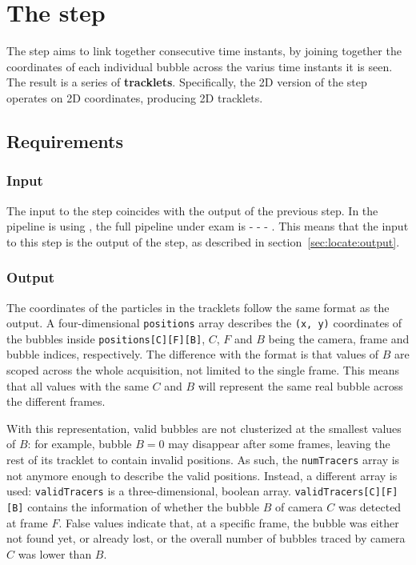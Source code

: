 \chapter{The \linkDD* step}
\label{chap:2dlink}

The \link* step aims to link together consecutive time instants, by joining together the coordinates of each individual bubble across the varius time instants it is seen.
The result is a series of \textbf{tracklets}.
Specifically, the 2D version of the \link* step operates on 2D coordinates, producing 2D tracklets.

\section{Requirements}

\subsection{Input}

The input to the \link* step coincides with the output of the previous step.
In the pipeline is using \linkDD*, the full pipeline under exam is \locate* - \link* - \match* - \visual*.
This means that the input to this step is the output of the \locate* step, as described in section~\ref{sec:locate:output}.

\subsection{Output}

The coordinates of the particles in the tracklets follow the same format as the \locate* output.
A four-dimensional \texttt{positions} array describes the \texttt{(x, y)} coordinates of the bubbles inside \texttt{positions[C][F][B]}, $C$, $F$ and $B$ being the camera, frame and bubble indices, respectively.
The difference with the \locate* format is that values of $B$ are scoped across the whole acquisition, not limited to the single frame.
This means that all values with the same $C$ and $B$ will represent the same real bubble across the different frames.

With this representation, valid bubbles are not clusterized at the smallest values of $B$: for example, bubble $B{=}0$ may disappear after some frames, leaving the rest of its tracklet to contain invalid positions.
As such, the \texttt{numTracers} array is not anymore enough to describe the valid positions.
Instead, a different array is used: \texttt{validTracers} is a three-dimensional, boolean array.
\texttt{validTracers[C][F][B]} contains the information of whether the bubble $B$ of camera $C$ was detected at frame $F$.
False values indicate that, at a specific frame, the bubble was either not found yet, or already lost, or the overall number of bubbles traced by camera $C$ was lower than $B$.

